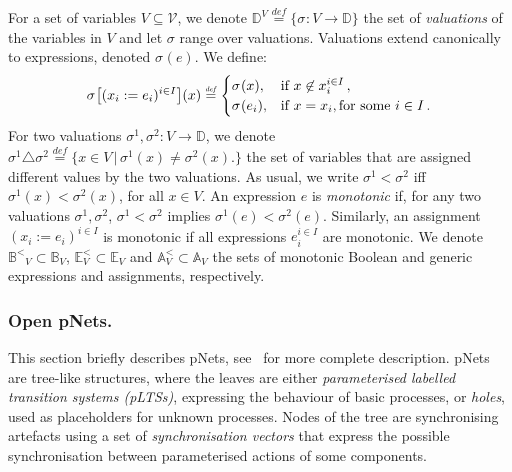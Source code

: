 \documentclass{llncs}
\newcommand{\Ludo}{\\\hfill\mdash Ludo}
\newcommand{\noteLH}[2][color=orange!40, size=\tiny]{\todo[#1]{{#2}\Ludo}}
\newcommand{\add}[2][Added]{\todo[color=blue!20, size=\tiny]{#1}{\color{blue}#2}}
\newcommand{\addSB}[1]{\add[Added by Simon]{#1}}
\newcommand{\sA}{\ensuremath{\mathbb{A}}}
\newcommand{\sB}{\ensuremath{\mathbb{B}}}
\newcommand{\sD}{\ensuremath{\mathbb{D}}}
\newcommand{\sE}{\ensuremath{\mathbb{E}}}
\newcommand{\cV}{\ensuremath{\mathcal{V}}}
\newcommand{\mdash}[1][]{---#1}
\newcommand{\bydef}[1]{\ensuremath{\stackrel{\mathit{\scriptscriptstyle def}}{#1}}}
\newcommand{\bsetdef}[2]{\ensuremath{\bigl\{{#1}\,\bigl|\,{#2}\bigr.\bigr\}}}
\newcommand{\order}{<}
\newcommand{\ordbool}{\ensuremath{\sB^{\order}}}
\newcommand{\data}{\ensuremath{\sD}}
\newcommand{\variables}{\ensuremath{\cV}}
\newcommand{\exprs}[1]{\ensuremath{\sE_{#1}}}
\newcommand{\monexprs}[1]{\ensuremath{\sE^{\order}_{#1}}}
\newcommand{\boolexprs}[1]{\ensuremath{\sB_{#1}}}
\newcommand{\guards}[1]{\ensuremath{\ordbool_{#1}}}
\newcommand{\assigns}[1]{\ensuremath{\sA_{#1}}}
\newcommand{\updates}[1]{\ensuremath{\sA^{\order}_{#1}}}
\newcommand{\valuations}[1]{\ensuremath{\data^{#1}}}
\newcommand{\val}[3][]{\ensuremath{#1{\sigma}^{#2}_{#3}}}
\newcommand{\valdiff}[2]{\ensuremath{#1 \triangle #2}}
\begin{document}
For a set of variables $V \subseteq \variables$, we denote
$\valuations{V} \bydef{=} \{\val{}{}: V \rightarrow \data\}$
the set of \emph{valuations} of the variables in $V$ and let $\sigma$ range over valuations.
Valuations extend canonically to expressions, denoted $\val{}{}(e)$. We define:
\vspace{-1.5ex}
\[
\val{}{}\bigl[(x_i := e_i)^{i \in I}\bigr](x) \bydef{=}
\begin{cases}
  \val{}{}(x), & \text{if } x \not\in x_i^{i \in I}\,,\\
  \val{}{}(e_i), & \text{if } x = x_i, \text{for some } i \in I\,.
\end{cases}\vspace{-1ex}
\]
For two valuations $\val{1}{}, \val{2}{} : V \rightarrow
\data$, we denote $\valdiff{\val{1}{}}{\val{2}{}} \bydef{=}
\bsetdef{x \in V}{\val{1}{}(x) \neq \val{2}{}(x)}$ the set of
variables that are assigned different values by the two
valuations.  As usual, we write $\val{1}{} \order \val{2}{}$
iff $\val{1}{}(x) \order \val{2}{}(x)$, for all $x \in V$.  An
expression $e$ is  \emph{monotonic} if, for
any two valuations $\val{1}{}, \val{2}{}$,
$\val{1}{} \order \val{2}{}$ implies $\val{1}{}(e) \order
\val{2}{}(e)$.
%
Similarly, an assignment $(x_i := e_i)^{i \in I} $ is
 monotonic if all expressions $e_i^{i \in I}$ are monotonic.
We  denote $\guards{V} \subset \boolexprs{V}$, $\monexprs{V}
\subset \exprs{V}$ and $\updates{V} \subset \assigns{V}$ the sets of
monotonic Boolean and generic expressions and assignments,
respectively.
%

\subsubsection{Open pNets.}
\label{secn:pNets}
This section briefly describes pNets, see~\cite{HMZ-FORTE2016} for more complete   description.
pNets are tree-like structures, where the leaves are either
\emph{parameterised labelled transition systems (pLTSs)}, expressing the
behaviour of basic processes, or \emph{holes}, used as placeholders
for unknown processes.
Nodes of the tree are synchronising artefacts using a
set of \emph{synchronisation vectors} that express the possible
synchronisation between  parameterised actions of some components.
\end{document}
